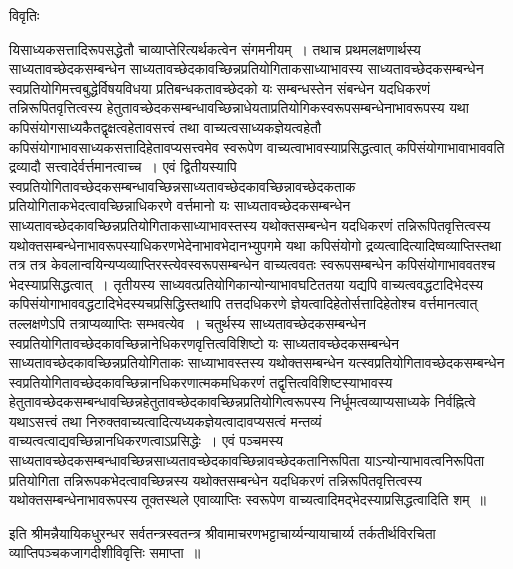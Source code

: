 \documentclass[10pt, openany]{book}
\renewcommand{\headrulewidth}{0pt}
\begin{document}
{\newpage
\begin{center}     विवृतिः \end{center}
यिसाध्यकसत्तादिरूपसद्धेतौ चाव्याप्तेरित्यर्थकत्वेन संगमनीयम्~। तथाच प्रथमलक्षणार्थस्य साध्यतावच्छेदकसम्बन्धेन साध्यतावच्छेदकावच्छिन्नप्रतियोगिताकसाध्याभावस्य साध्यतावच्छेदकसम्बन्धेन स्वप्रतियोगिमत्त्वबुद्धेर्विषयविधया प्रतिबन्धकतावच्छेदको यः सम्बन्धस्तेन संबन्धेन यदधिकरणं तन्निरूपितवृत्तित्वस्य हेतुतावच्छेदकसम्बन्धावच्छिन्नाधेयताप्रतियोगिकस्वरूपसम्बन्धेनाभावरूपस्य यथा कपिसंयोगसाध्यकैतद्वृक्षत्वहेतावसत्त्वं तथा वाच्यत्वसाध्यकज्ञेयत्वहेतौ
कपिसंयोगाभावसाध्यकसत्तादिहेतावप्यसत्त्वमेव स्वरूपेण वाच्यत्वाभावस्याप्रसिद्धत्वात् कपिसंयोगाभावाभाववति द्रव्यादौ सत्त्वादेर्वर्त्तमानत्वाच्च~। एवं
द्वितीयस्यापि स्वप्रतियोगितावच्छेदकसम्बन्धावच्छिन्नसाध्यतावच्छेदकावच्छिन्नावच्छेदकताक प्रतियोगिताकभेदत्वावच्छिन्नाधिकरणे वर्त्तमानो यः साध्यतावच्छेदकसम्बन्धेन साध्यतावच्छेदकावच्छिन्नप्रतियोगिताकसाध्याभावस्तस्य यथोक्तसम्बन्धेन यदधिकरणं तन्निरूपितवृत्तित्वस्य यथोक्तसम्बन्धेनाभावरूपस्याधिकरणभेदेनाभावभेदानभ्युपगमे यथा कपिसंयोगो द्रव्यत्वादित्यादिष्वव्याप्तिस्तथा तत्र तत्र केवलान्वयिन्यप्यव्याप्तिरस्त्येवस्वरूपसम्बन्धेन वाच्यत्ववतः स्वरूपसम्बन्धेन कपिसंयोगाभाववतश्च भेदस्याप्रसिद्धत्वात्~। तृतीयस्य साध्यवत्प्रतियोगिकान्योन्याभावघटिततया यद्यपि वाच्यत्ववद्धटादिभेदस्य कपिसंयोगाभाववद्धटादिभेदस्यचप्रसिद्धिस्तथापि तत्तदधिकरणे ज्ञेयत्वादिहेतोर्सत्तादिहेतोश्च वर्त्तमानत्वात् तल्लक्षणेऽपि तत्राप्यव्याप्तिः सम्भवत्येव~। चतुर्थस्य साध्यतावच्छेदकसम्बन्धेन स्वप्रतियोगितावच्छेदकावच्छिन्नानेधिकरणवृत्तित्वविशिष्टो यः साध्यतावच्छेदकसम्बन्धेन साध्यतावच्छेदकावच्छिन्नप्रतियोगिताकः साध्याभावस्तस्य यथोक्तसम्बन्धेन यत्स्वप्रतियोगितावच्छेदकसम्बन्धेन स्वप्रतियोगितावच्छेदकावच्छिन्नानधिकरणात्मकमधिकरणं तद्वृत्तित्वविशिष्टस्याभावस्य
हेतुतावच्छेदकसम्बन्धावच्छिन्नहेतुतावच्छेदकावच्छिन्नप्रतियोगित्वरूपस्य निर्धूमत्वव्याप्यसाध्यके निर्वह्नित्वे यथाऽसत्त्वं तथा निरुक्तवाच्यत्वादित्यध्यकज्ञेयत्वादावप्यसत्वं मन्तव्यं
वाच्यत्वत्वाद्यवच्छिन्नानधिकरणत्वाऽप्रसिद्धेः~। एवं पञ्चमस्य साध्यतावच्छेदकसम्बन्धावच्छिन्नसाध्यतावच्छेदकावच्छिन्नावच्छेदकतानिरूपिता याऽन्योन्याभावत्वनिरूपिता प्रतियोगिता तन्निरूपकभेदत्वावच्छिन्नस्य यथोक्तसम्बन्धेन यदधिकरणं तन्निरूपितवृत्तित्वस्य यथोक्तसम्बन्धेनाभावरूपस्य तूक्तस्थले एवाव्याप्तिः स्वरूपेण
वाच्यत्वादिमद्भेदस्याप्रसिद्धत्वादिति शम्~॥
\begin{center}
{\vpc इति श्रीमन्नैयायिकधुरन्धर सर्वतन्त्रस्वतन्त्र श्रीवामाचरणभट्टाचार्य्यन्यायाचार्य्य तर्कतीर्थविरचिता व्याप्तिपञ्चकजागदीशीविवृत्तिः समाप्ता~॥}   
\end{center}
\newpage
\renewcommand{\headrulewidth}{0pt}
 \pagestyle{empty}


}
\end{document}
